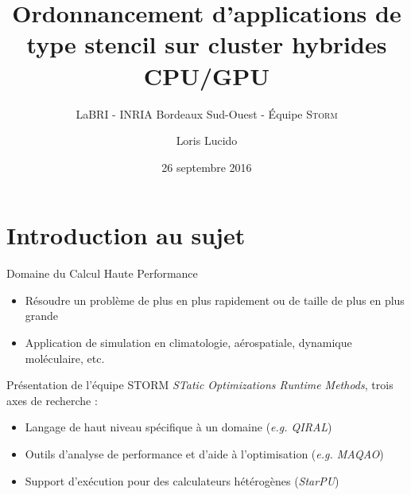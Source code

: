 \documentclass[9pt]{beamer}
\author{Loris Lucido}
\date{26 septembre 2016}
\title{Ordonnancement d'applications de type stencil sur cluster hybrides CPU/GPU}
\subtitle{LaBRI - INRIA Bordeaux Sud-Ouest - Équipe \textsc{Storm}}
\begin{document}
\begin{frame}[plain]
  \titlepage
\end{frame}


\section{Introduction au sujet}

\begin{frame}{Domaine du Calcul Haute Performance}
  \begin{itemize}
  \item Résoudre un problème de plus en plus rapidement ou de taille de
    plus en plus grande
    \vfill
  \item Application de simulation en climatologie, aérospatiale, dynamique
    moléculaire, etc.
  \end{itemize}
\end{frame}

\begin{frame}{Présentation de l'équipe \textsc{STORM}}
  \vfill
  \textit{STatic Optimizations Runtime Methods}, trois axes de recherche :
  \vfill
  \begin{itemize}
  \item Langage de haut niveau spécifique à un domaine (\textit{e.g. QIRAL})
  \vfill
  \item Outils d'analyse de performance et d'aide à l'optimisation (\textit{e.g. MAQAO})
  \vfill
  \item Support d'exécution pour des calculateurs hétérogènes (\textit{StarPU})
  \end{itemize}
  \vfill
\end{frame}
\end{document}

